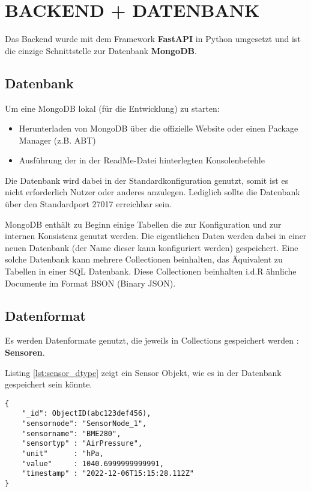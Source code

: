\section{BACKEND + DATENBANK}\label{ch:backend}

Das Backend wurde mit dem Framework \textbf{FastAPI} in Python umgesetzt und ist die einzige Schnittstelle zur Datenbank \textbf{MongoDB}.

\subsection{Datenbank}
Um eine MongoDB lokal (für die Entwicklung) zu starten:
\begin{itemize}
\item Herunterladen von MongoDB über die offizielle Website oder einen Package Manager (z.B. ABT)
\item Ausführung der in der ReadMe-Datei hinterlegten Konsolenbefehle
\end{itemize}
Die Datenbank wird dabei in der Standardkonfiguration genutzt, somit ist es nicht erforderlich Nutzer oder anderes anzulegen.
Lediglich sollte die Datenbank über den Standardport 27017 erreichbar sein.

MongoDB enthält zu Beginn einige Tabellen die zur Konfiguration und zur internen Konsistenz genutzt werden.
Die eigentlichen Daten werden dabei in einer neuen Datenbank (der Name dieser kann konfiguriert werden) gespeichert.
Eine solche Datenbank kann mehrere Collectionen beinhalten, das Äquivalent zu Tabellen in einer SQL Datenbank.
Diese Collectionen beinhalten i.d.R ähnliche Documente im Format BSON (Binary JSON). 

\subsection{Datenformat}
Es werden Datenformate genutzt, die jeweils in Collections gespeichert werden : \textbf{Sensoren}.

Listing \ref{lst:sensor_dtype} zeigt ein Sensor Objekt, wie es in der Datenbank gespeichert sein könnte.
\begin{lstlisting}[caption={Sensor Objekt},captionpos=b,showstringspaces=false, basicstyle=\small,label={lst:sensor_dtype}]
{
    "_id": ObjectID(abc123def456),
    "sensornode": "SensorNode_1",
    "sensorname": "BME280",
    "sensortyp" : "AirPressure",
    "unit"      : "hPa,
    "value"     : 1040.6999999999991,
    "timestamp" : "2022-12-06T15:15:28.112Z"
}
\end{lstlisting}

